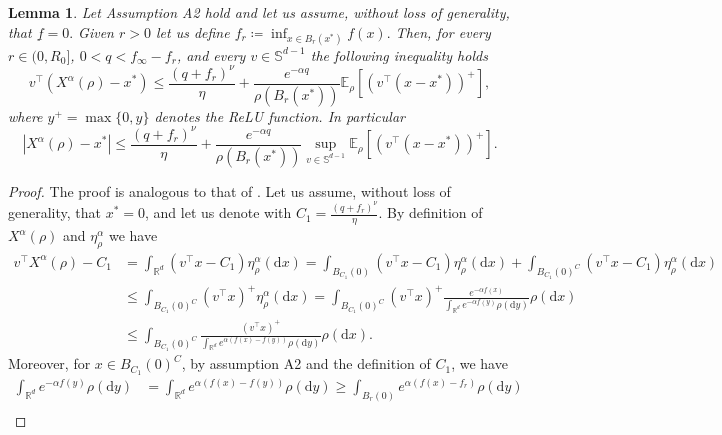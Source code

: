 \documentclass[reqno]{amsart}
\numberwithin{algorithm}{section}
\newcommand{\diff}{\mathrm{d}}
\newcommand{\R}{\mathbb{R}}
\newcommand{\Xalpha}{{X^\alpha}}
\newtheorem{lemma}[theorem]{Lemma}
\begin{document}
{\begin{lemma}\label{lemma:laplace3}
Let Assumption A2 hold and let us assume, without loss of generality, that $\underline f = 0.$ Given $r>0$ let us define $f_r\coloneqq\inf_{x\in B_r(x^*)}f(x).$ Then, for every $r\in(0,R_0]$, $0<q<f_{\infty}-f_r$, and every $v\in\mathbb S^{d-1}$ the following inequality holds
    \begin{equation}
        v^\top(\Xalpha(\rho) - x^*)
        \leq\frac{(q+ f_r)^\nu}{\eta} + \frac{e^{-\alpha q}}{\rho(B_r(x^*))}\mathbb E_\rho\left[\left(v^\top(x- x^*)\right)^+\right],
    \end{equation}
    where $y^+ = \max\{0,y\}$ denotes the ReLU function.
    In particular
    \begin{equation}\label{lap32}
        |\Xalpha(\rho) - x^*|
        \leq\frac{(q+ f_r)^\nu}{\eta} + \frac{e^{-\alpha q}}{\rho(B_r(x^*))}  \sup_{v\in\mathbb S^{d-1}}\mathbb E_\rho\left[\left(v^\top(x- x^*)\right)^+\right].
    \end{equation}
\end{lemma}
\begin{proof}
    The proof is analogous to that of \cite[Proposition 4.5]{B1-fornasier2021global}. Let us assume, without loss of generality, that $x^*=0$, and let us denote with $C_1 = \frac{(q+ f_r)^\nu}{\eta}.$ By definition of $\Xalpha(\rho)$ and $\eta^\alpha_\rho$ we have 
    \begin{equation}\label{vTxalpha1}
    \begin{aligned}
        v^\top\Xalpha(\rho)-C_1 &= \int_{\R^d} (v^\top x-C_1) \eta^\alpha_\rho(\diff x)  = \int_{B_{C_1}(0)} (v^\top x-C_1) \eta^\alpha_\rho(\diff x) + \int_{B_{C_1}(0)^C} (v^\top x-C_1) \eta^\alpha_\rho(\diff x)\\
        &\leq \int_{B_{C_1}(0)^C} (v^\top x)^+ \eta^\alpha_\rho(\diff x) = \int_{B_{C_1}(0)^C} (v^\top x)^+ \frac{e^{-\alpha f(x)}}{\int_{\R^d}e^{-\alpha f(y) } \rho(\diff y)}\rho(\diff x)\\
        &\leq \int_{B_{C_1}(0)^C}  \frac{(v^\top x)^+}{\int_{\R^d}e^{\alpha(f(x)-f(y)) } \rho(\diff y)}\rho(\diff x).
    \end{aligned}
    \end{equation}
    Moreover, for $x\in B_{C_1}(0)^C$, by assumption A2 and the definition of $C_1$, we have
    \begin{equation*}
        \begin{aligned}
          \int_{\R^d}e^{-\alpha f(y) } \rho(\diff y)  &= {\int_{\R^d}e^{\alpha(f(x)-f(y)) } \rho(\diff y)}\geq \int_{B_r(0)}e^{\alpha(f(x)-f_r)} \rho(\diff y) \\

\end{aligned}
\end{equation*}
\end{proof}}
\end{document}
